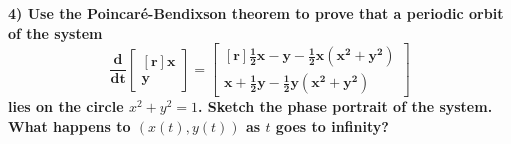 \documentclass[11pt]{article}
\begin{document}
 \textbf{4) Use the Poincar\'{e}-Bendixson theorem to prove that a periodic orbit of the system}
 \[\mathbf{\frac{d}{dt} \begin{bmatrix*}[r] x \\ y \end{bmatrix*} = 
   \begin{bmatrix*}[r] \frac{1}{2}x-y - \frac{1}{2}x(x^2+y^2) \\ 
   x+\frac{1}{2}y - \frac{1}{2}y(x^2+y^2) \end{bmatrix*}}\]
 \textbf{lies on the circle \(x^2+y^2=1\). Sketch the phase portrait of the system. What happens 
 to \((x(t),y(t))\) as \(t\) goes to infinity?}
\end{document}
